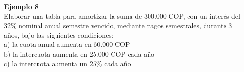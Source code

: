 	\textbf{Ejemplo 8}\\
	Elaborar una tabla para amortizar la suma de  300.000  COP, con un interés del 32\% nominal anual semestre vencido, mediante pagos semestrales, durante 3 años, bajo las siguientes condiciones:\\
	a)	la cuota anual aumenta en  60.000  COP \\
	b)	la intercuota aumenta en  25.000  COP  cada año \\
	c)	la intercuota aumenta un 25\% cada año\\\\
	
	
 
	
 
    


